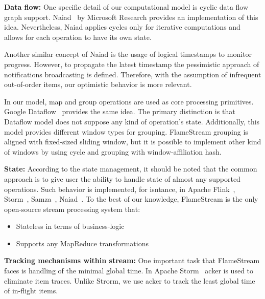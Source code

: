 
\label {fs-related-section}

{\bf Data flow:}
One specific detail of our computational model is cyclic data flow graph support. Naiad~\cite{Murray:2013:NTD:2517349.2522738} by Microsoft Research provides an implementation of this idea. Nevertheless, Naiad applies cycles only for iterative computations and allows for each operation to have its own state. 

Another similar concept of Naiad is the usage of logical timestamps to monitor progress. However, to propagate the latest timestamp the pessimistic approach of notifications broadcasting is defined. Therefore, with the assumption of infrequent out-of-order items, our optimistic behavior is more relevant.

In our model, map and group operations are used as core processing primitives. Google Dataflow~\cite{Akidau:2015:DMP:2824032.2824076} provides the same idea. The primary distinction is that Dataflow model does not suppose any kind of operation's state. Additionally, this model provides different window types for grouping. FlameStream grouping is aligned with fixed-sized sliding window, but it is possible to implement other kind of windows by using cycle and grouping with window-affiliation hash.

{\bf State:}
According to the state management, it should be noted that the common approach is to give user the ability to handle state of almost any supported operations. Such behavior is implemented, for isntance, in Apache Flink~\cite{carbone2015apache}, Storm~\cite{apache:storm}, Samza~\cite{Noghabi:2017:SSS:3137765.3137770}, Naiad~\cite{Murray:2013:NTD:2517349.2522738}.
To the best of our knowledge, FlameStream is the only open-source stream processing system that:
\begin{itemize}
    \item Stateless in terms of business-logic
    \item Supports any MapReduce transformations 
\end{itemize}

{\bf Tracking mechanisms within stream:}
One important task that FlameStream faces is handling of the minimal global time. In Apache Storm~\cite{apache:storm} acker is used to eliminate item traces. Unlike Strorm, we use acker to track the least global time of in-flight items.
